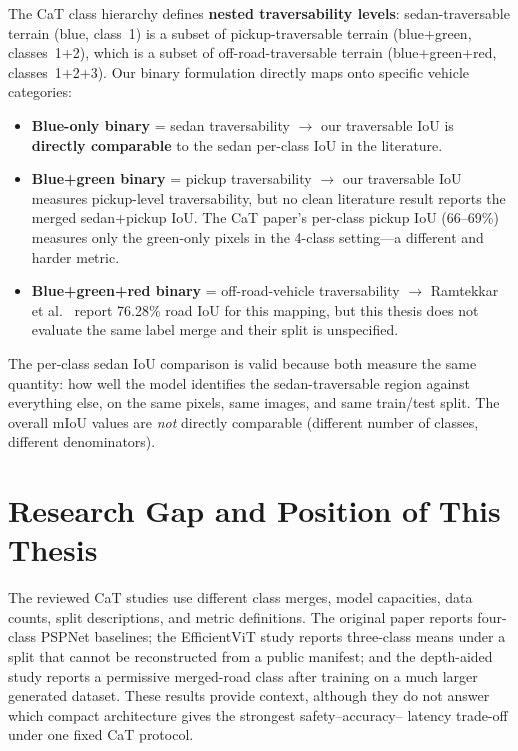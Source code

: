 \documentclass[12pt,a4paper]{report}
\begin{document}
The CaT class hierarchy defines \textbf{nested traversability levels}: sedan-traversable terrain (blue, class~1) is a subset of pickup-traversable terrain (blue+green, classes~1+2), which is a subset of off-road-traversable terrain (blue+green+red, classes~1+2+3).
Our binary formulation directly maps onto specific vehicle categories:
\begin{itemize}[nosep]
  \item \textbf{Blue-only binary} = sedan traversability $\rightarrow$ our traversable IoU is \textbf{directly comparable} to the sedan per-class IoU in the literature.
  \item \textbf{Blue+green binary} = pickup traversability $\rightarrow$ our traversable IoU measures pickup-level traversability, but no clean literature result reports the merged sedan+pickup IoU. The CaT paper's per-class pickup IoU (66--69\%) measures only the green-only pixels in the 4-class setting---a different and harder metric.
  \item \textbf{Blue+green+red binary} = off-road-vehicle traversability $\rightarrow$ Ramtekkar et al.~\cite{ramtekkar2024depth} report 76.28\% road IoU for this mapping, but this thesis does not evaluate the same label merge and their split is unspecified.
\end{itemize}
The per-class sedan IoU comparison is valid because both measure the same quantity: how well the model identifies the sedan-traversable region against everything else, on the same pixels, same images, and same train/test split.
The overall mIoU values are \emph{not} directly comparable (different number of classes, different denominators).

\section{Research Gap and Position of This Thesis}

The reviewed CaT studies use different class merges, model capacities, data
counts, split descriptions, and metric definitions. The original paper reports
four-class PSPNet baselines; the EfficientViT study reports three-class means
under a split that cannot be reconstructed from a public manifest; and the
depth-aided study reports a permissive merged-road class after training on a
much larger generated dataset. These results provide context, although they do
not answer which compact architecture gives the strongest safety--accuracy--
latency trade-off under one fixed CaT protocol.
\end{document}
